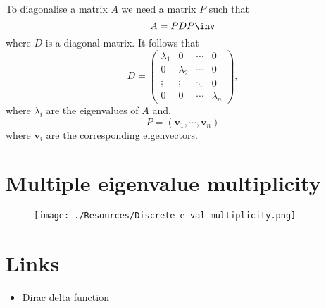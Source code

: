 \documentclass[12pt, a4paper]{article}
\begin{document}
\begin{mdthm}
    To diagonalise a matrix \(A\) we need a matrix \(P\) such that 
    \[A = PDP\inv\]
    where \(D\) is a diagonal matrix. It follows that 
    \[D = \begin{pmatrix}
        \lambda_1 & 0 &\cdots & 0 \\
        0 &\lambda_2 & \cdots & 0 \\
        \vdots & \vdots & \ddots & 0 \\
        0 & 0 & \cdots & \lambda_n
    \end{pmatrix},\]
    where \(\lambda_i\) are the eigenvalues of \(A\) and, 
    \[P = (\bm{v}_1, \cdots, \bm{v}_n)\]
    where \(\bm{v}_i\) are the corresponding eigenvectors.
\end{mdthm}

\section{Multiple eigenvalue multiplicity}

\begin{figure}[H]
     \begin{center}
         \texttt{[image: ./Resources/Discrete e-val multiplicity.png]}
     \end{center}
\end{figure}

\section{Links}

\begin{itemize}
    \item \href{https://www.youtube.com/watch?v=Y8y965ZAmQE}{Dirac delta function}
\end{itemize}
\end{document}
